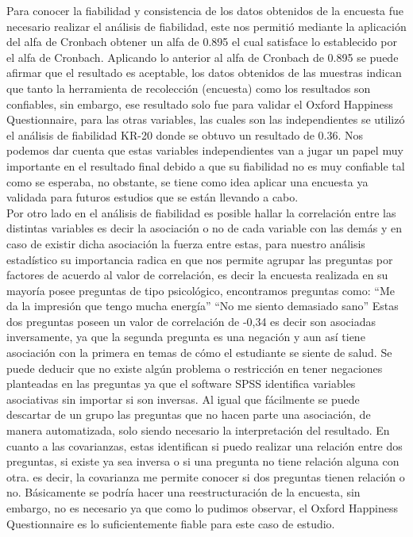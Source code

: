 \documentclass[conference]{IEEEtran}
\begin{document}
   
   Para conocer la fiabilidad y consistencia de los datos obtenidos de la encuesta fue necesario realizar el análisis de fiabilidad, este nos permitió mediante la aplicación del alfa de Cronbach obtener un alfa de 0.895 el cual satisface lo establecido por el alfa de Cronbach. Aplicando lo anterior al alfa de Cronbach de 0.895 se puede afirmar que el resultado es aceptable, los datos obtenidos de las muestras indican que tanto la herramienta de recolección (encuesta) como los resultados son confiables, sin embargo, ese resultado solo fue para validar el Oxford Happiness Questionnaire, para las otras variables, las cuales son las independientes se utilizó el análisis de fiabilidad KR-20 donde se obtuvo un resultado de 0.36. Nos podemos dar cuenta que estas variables independientes van a jugar un papel muy importante en el resultado final debido a que su fiabilidad no es muy confiable tal como se esperaba, no obstante, se tiene como idea aplicar una encuesta ya validada para futuros estudios que se están llevando a cabo.\\

   Por otro lado en el análisis de fiabilidad es posible hallar la correlación entre las distintas variables es decir la asociación o no de cada variable con las demás y en caso de existir dicha asociación la fuerza entre estas, para nuestro análisis estadístico su importancia radica en que nos permite agrupar las preguntas por factores de acuerdo al valor de correlación, es decir la encuesta realizada en su mayoría posee preguntas de tipo psicológico, encontramos preguntas como: “Me da la impresión que tengo mucha energía” “No me siento demasiado sano” Estas dos preguntas poseen un valor de correlación de -0,34 es decir son asociadas inversamente, ya que la segunda pregunta es una negación y aun así tiene asociación con la primera en temas de cómo el estudiante se siente de salud. Se puede deducir que no existe algún problema o restricción en tener negaciones planteadas en las preguntas ya que el software SPSS identifica variables asociativas sin importar si son inversas. Al igual que fácilmente se puede descartar de un grupo las preguntas que no hacen parte una asociación, de manera automatizada, solo siendo necesario la interpretación del resultado. En cuanto a las covarianzas, estas identifican si puedo realizar una relación entre dos preguntas, si existe ya sea inversa o si una pregunta no tiene relación alguna con otra. es decir, la covarianza me permite conocer si dos preguntas tienen relación o no. Básicamente se podría hacer una reestructuración de la encuesta, sin embargo, no es necesario ya que como lo pudimos observar, el Oxford Happiness Questionnaire es lo suficientemente fiable para este caso de estudio.\\
\end{document}
